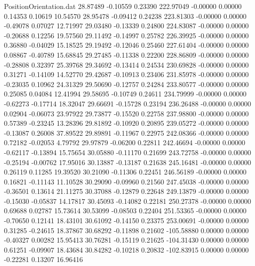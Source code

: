 \begin{filecontents}{PositionOrientation.dat}
  28.87489   -0.10559    0.23390   222.97049   -0.00000    0.00000    0.14353    0.10619   10.54570
  28.95478   -0.09412    0.24238   223.81303   -0.00000    0.00000   -0.49078    0.07027   12.71997
  29.03480   -0.13339    0.24800   224.83087   -0.00000    0.00000   -0.20688    0.12256   19.57560
  29.11492   -0.14997    0.25782   226.39925   -0.00000    0.00000    0.36880   -0.04029   15.18525
  29.19492   -0.12046    0.25460   227.61404   -0.00000    0.00000    0.08867   -0.40789   15.68845
  29.27485   -0.11338    0.22200   228.86809   -0.00000    0.00000   -0.28808    0.32397   25.39768
  29.34692   -0.13414    0.24534   230.69828   -0.00000    0.00000    0.31271   -0.14109   14.52770
  29.42687   -0.10913    0.23406   231.85978   -0.00000    0.00000   -0.23035    0.10962   24.31329
  29.50690   -0.12757    0.24284   233.80577   -0.00000    0.00000    0.25085    0.04084   12.41994
  29.58695   -0.10749    0.24611   234.79999   -0.00000    0.00000   -0.62273   -0.17714   18.32047
  29.66691   -0.15728    0.23194   236.26488   -0.00000    0.00000    0.02904   -0.06073   23.97922
  29.73877   -0.15520    0.22758   237.98800   -0.00000    0.00000    0.57389   -0.23245   13.28396
  29.81892   -0.10920    0.20895   239.05272   -0.00000    0.00000   -0.13087    0.26008   37.89522
  29.89891   -0.11967    0.22975   242.08366   -0.00000    0.00000    0.72182   -0.02053    4.79792
  29.97879   -0.06200    0.22811   242.46694   -0.00000    0.00000   -0.62117   -0.13894   15.75654
  30.05880   -0.11170    0.21699   243.72758   -0.00000    0.00000   -0.25194   -0.00762   17.95016
  30.13887   -0.13187    0.21638   245.16481   -0.00000    0.00000    0.26119    0.11285   19.39520
  30.21090   -0.11306    0.22451   246.56189   -0.00000    0.00000    0.16821   -0.11143   11.10528
  30.29090   -0.09960    0.21560   247.45038   -0.00000    0.00000   -0.36501    0.13614   21.11275
  30.37088   -0.12879    0.22648   249.13879   -0.00000    0.00000   -0.15030   -0.05837   14.17817
  30.45093   -0.14082    0.22181   250.27378   -0.00000    0.00000    0.69688    0.02787   15.73614
  30.53099   -0.08503    0.22404   251.53365   -0.00000    0.00000   -0.70650    0.12141   18.43101
  30.61092   -0.14150    0.23375   253.00691   -0.00000    0.00000    0.31285   -0.24615   18.37867
  30.68292   -0.11898    0.21602  -105.58880    0.00000    0.00000   -0.40327    0.00282   15.95413
  30.76281   -0.15119    0.21625  -104.31430    0.00000    0.00000    0.61251   -0.09907   18.43684
  30.84282   -0.10218    0.20832  -102.83915    0.00000    0.00000   -0.22281    0.13207   16.96416

\end{filecontents}
